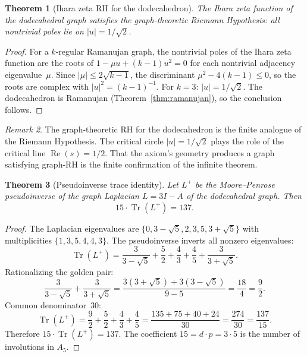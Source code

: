 \documentclass[12pt, a4paper]{article}
\theoremstyle{plain}
\newtheorem{theorem}{Theorem}[section]
\theoremstyle{definition}
\theoremstyle{remark}
\newtheorem{remark}[theorem]{Remark}
\newcommand{\re}{\operatorname{Re}}
\newcommand{\Tr}{\operatorname{Tr}}
\begin{document}
\begin{theorem}[Ihara zeta RH for the dodecahedron]\label{thm:ihara}
  The Ihara zeta function of the dodecahedral graph satisfies the
  graph-theoretic Riemann Hypothesis: all nontrivial poles lie on
  $|u| = 1/\sqrt{2}$.
\end{theorem}

\begin{proof}
  For a $k$-regular Ramanujan graph, the nontrivial poles of the
  Ihara zeta function are the roots of $1 - \mu u + (k-1)u^2 = 0$
  for each nontrivial adjacency eigenvalue~$\mu$.
  Since $|\mu| \leq 2\sqrt{k-1}$, the discriminant
  $\mu^2 - 4(k-1) \leq 0$, so the roots are complex with
  $|u|^2 = (k-1)^{-1}$.  For $k = 3$: $|u| = 1/\sqrt{2}$.
  The dodecahedron is Ramanujan (Theorem~\ref{thm:ramanujan}),
  so the conclusion follows.
\end{proof}

\begin{remark}
  The graph-theoretic RH for the dodecahedron is the finite
  analogue of the Riemann Hypothesis.  The critical circle
  $|u| = 1/\sqrt{2}$ plays the role of the critical line
  $\re(s) = 1/2$.  That the axiom's geometry produces a graph
  satisfying graph-RH is the finite confirmation of the infinite
  theorem.
\end{remark}

\begin{theorem}[Pseudoinverse trace identity]\label{thm:137}
  Let $L^+$ be the Moore--Penrose pseudoinverse of the graph Laplacian
  $L = 3I - A$ of the dodecahedral graph.  Then
  \begin{equation}\label{eq:137}
    15 \cdot \Tr(L^+) = 137.
  \end{equation}
\end{theorem}

\begin{proof}
  The Laplacian eigenvalues are $\{0, 3-\sqrt{5}, 2, 3, 5, 3+\sqrt{5}\}$
  with multiplicities $\{1, 3, 5, 4, 4, 3\}$.
  The pseudoinverse inverts all nonzero eigenvalues:
  \[
    \Tr(L^+) = \frac{3}{3-\sqrt{5}} + \frac{5}{2} + \frac{4}{3}
    + \frac{4}{5} + \frac{3}{3+\sqrt{5}}.
  \]
  Rationalizing the golden pair:
  \[
    \frac{3}{3-\sqrt{5}} + \frac{3}{3+\sqrt{5}}
    = \frac{3(3+\sqrt{5}) + 3(3-\sqrt{5})}{9 - 5}
    = \frac{18}{4} = \frac{9}{2}.
  \]
  Common denominator~$30$:
  \[
    \Tr(L^+) = \frac{9}{2} + \frac{5}{2} + \frac{4}{3} + \frac{4}{5}
    = \frac{135 + 75 + 40 + 24}{30} = \frac{274}{30} = \frac{137}{15}.
  \]
  Therefore $15 \cdot \Tr(L^+) = 137$.
  The coefficient $15 = d \cdot p = 3 \cdot 5$ is the number of
  involutions in $A_5$.
\end{proof}
\end{document}
